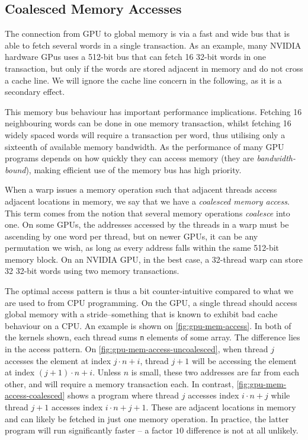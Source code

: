 \subsection{Coalesced Memory Accesses}
\label{sec:gpu-coalesced}

The connection from GPU to global memory is via a fast and wide bus
that is able to fetch several words in a single transaction.  As an
example, many NVIDIA hardware GPus uses a 512-bit bus that can fetch
16 32-bit words in one transaction, but only if the words are stored
adjacent in memory and do not cross a cache line.  We will ignore the
cache line concern in the following, as it is a secondary effect.

This memory bus behaviour has important performance implications.
Fetching 16 neighbouring words can be done in one memory transaction,
whilst fetching 16 widely spaced words will require a transaction per
word, thus utilising only a sixteenth of available memory bandwidth.
As the performance of many GPU programs depends on how quickly they
can access memory (they are \textit{bandwidth-bound}), making
efficient use of the memory bus has high priority.

When a warp issues a memory operation such that adjacent threads
access adjacent locations in memory, we say that we have a
\textit{coalesced memory access}.  This term comes from the notion
that several memory operations \textit{coalesce} into one.  On some
GPUs, the addresses accessed by the threads in a warp must be
ascending by one word per thread, but on newer GPUs, it can be any
permutation we wish, as long as every address falls within the same
512-bit memory block.  On an NVIDIA GPU, in the best case, a 32-thread
warp can store 32 32-bit words using two memory transactions.

The optimal access pattern is thus a bit counter-intuitive compared to
what we are used to from CPU programming.  On the GPU, a single thread
should access global memory with a stride--something that is known to
exhibit bad cache behaviour on a CPU.  An example is shown on
\cref{fig:gpu-mem-access}.  In both of the kernels shown, each thread
sums \texttt{n} elements of some array.  The difference lies in the
access pattern.  On \cref{fig:gpu-mem-access-uncoalesced}, when thread
$j$ accesses the element at index $j\cdot{}n+i$, thread $j+1$ will be
accessing the element at index $(j+1)\cdot{}n+i$.  Unless $n$ is
small, these two addresses are far from each other, and will require a
memory transaction each.  In contrast,
\cref{fig:gpu-mem-access-coalesced} shows a program where thread $j$
accesses index $i\cdot{}n + j$ while thread $j+1$ accesses index
$i\cdot{}n + j + 1$.  These are adjacent locations in memory and can
likely be fetched in just one memory operation.  In practice, the
latter program will run significantly faster -- a factor $10$
difference is not at all unlikely.


